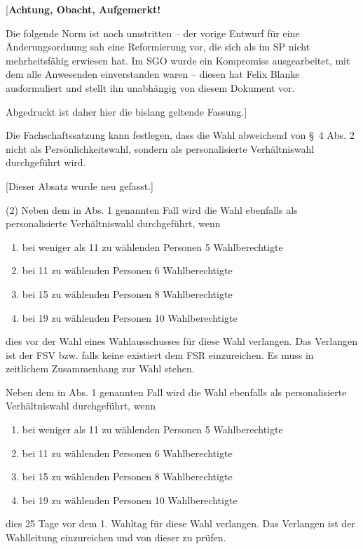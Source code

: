 \documentclass[%
draft,%
multilinesections%
]{fswo}
\newcommand\bemFr[1] {{\color{Red}[#1]}}
\newcommand\bemFe[1] {{\color{Cyan}[#1]}}
\newcommand\remark[1]{\begin{addmargin}{1cm}#1\end{addmargin}}
\newcommand\bemFr[1]{}%
\newcommand\bemFe[1]{}%
\newcommand\remark[1]{}
\begin{document}
\bemFr{\textbf{Achtung, Obacht, Aufgemerkt!}

Die folgende Norm ist noch umstritten – der vorige Entwurf für eine Änderungsordnung sah eine Reformierung vor, die sich als im SP nicht mehrheitsfähig erwiesen hat.
Im SGO wurde ein Kompromiss ausgearbeitet, mit dem alle Anwesenden einverstanden waren – diesen hat Felix Blanke ausformuliert und stellt ihn unabhängig von diesem Dokument vor.

Abgedruckt ist daher hier die bislang geltende Fassung.}


\begin{contract}
\label{cls-verhaeltniswahl}
Die Fachschaftssatzung kann festlegen, dass die Wahl abweichend von \S~4 Abs. 2 nicht als Persönlichkeitswahl, sondern als personalisierte Verhältniswahl durchgeführt wird.

\remark{%
\bemFe{Dieser Absatz wurde neu gefasst.}

\color{Gray}
(2) Neben dem in Abs. 1 genannten Fall wird die Wahl ebenfalls als personalisierte Verhältniswahl durchgeführt, wenn
\begin{enumerate}
\item bei weniger als 11 zu wählenden Personen 5 Wahlberechtigte
\item bei 11 zu wählenden Personen 6 Wahlberechtigte
\item bei 15 zu wählenden Personen 8 Wahlberechtigte
\item bei 19 zu wählenden Personen 10 Wahlberechtigte
\end{enumerate}
dies vor der Wahl eines Wahlausschusses für diese Wahl verlangen.
Das Verlangen ist der FSV bzw. falls keine existiert dem FSR einzureichen.
Es muss in zeitlichem Zusammenhang zur Wahl stehen.}

\begingroup
\makeatletter
  \ifFK@draft\color{Green}\fi
\makeatother
Neben dem in Abs. 1 genannten Fall wird die Wahl ebenfalls als
personalisierte Verhältniswahl durchgeführt, wenn
\begin{enumerate}
\item bei weniger als 11 zu wählenden Personen 5 Wahlberechtigte
\item bei 11 zu wählenden Personen 6 Wahlberechtigte
\item bei 15 zu wählenden Personen 8 Wahlberechtigte
\item bei 19 zu wählenden Personen 10 Wahlberechtigte
\end{enumerate}
dies 25 Tage vor dem 1. Wahltag für diese Wahl verlangen. Das Verlangen ist der Wahlleitung einzureichen und von dieser zu prüfen.
\endgroup


\end{contract}
\end{document}
